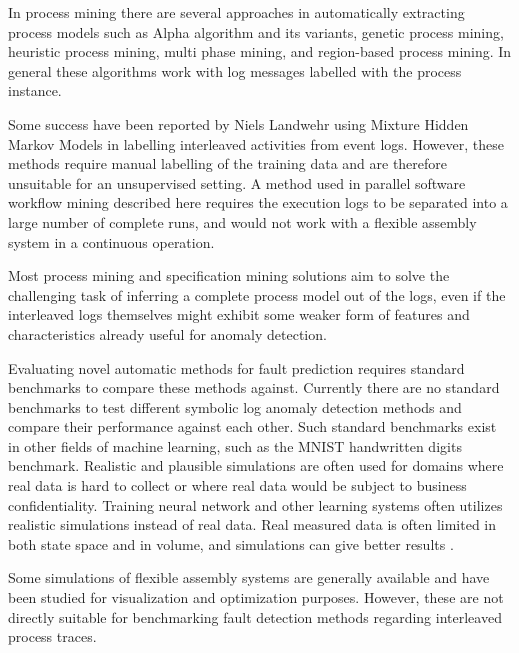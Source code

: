 \documentclass[procedia]{easychair}
\begin{document}
In process mining there are several approaches in automatically extracting process models such as Alpha algorithm and its 
variants, genetic process mining, heuristic process mining, multi phase mining, and region-based process mining. In general these algorithms work with log messages labelled with the process instance.

Some success have been reported by Niels Landwehr using Mixture Hidden Markov Models \cite{landwehr2008modeling} in labelling interleaved activities from event logs.
However, these methods require manual labelling of the training data and are therefore unsuitable for an unsupervised setting.
A method used in parallel software workflow mining described here \cite{mining-program-workflow-from-interleaved-traces} requires the execution logs to be separated into
a large number of complete runs, and would not work with a flexible assembly system in a continuous operation.

Most process mining and specification mining
solutions aim to solve the challenging task of inferring a complete process model out of the logs, even if the interleaved logs themselves might exhibit some weaker form of features
and characteristics already useful for anomaly detection.

Evaluating novel automatic methods for fault prediction requires standard benchmarks to compare these methods against. Currently there are no standard benchmarks to test
different symbolic log anomaly detection methods and compare their performance against each other. Such standard benchmarks exist in other fields of machine learning,
such as the MNIST handwritten digits benchmark\cite{lecun-mnisthandwrittendigit-2010}. Realistic and plausible simulations are often used\cite{jager2014assessing}\cite{FASTTRIPS} for domains where
real data is hard to collect or where real data would be subject to business confidentiality. Training neural network and other learning systems often utilizes realistic
simulations instead of real data\cite{weston2014memory}. Real measured data is often limited in both state space and in volume,
and simulations can give better results \cite{duch2005artificial}.

Some simulations of flexible assembly systems are generally available\cite{giulio}\cite{el1989simulation}\cite{donath1988flexible} and have been studied for visualization and optimization purposes.
However, these are not directly suitable for benchmarking fault detection methods regarding interleaved process traces.
\end{document}
